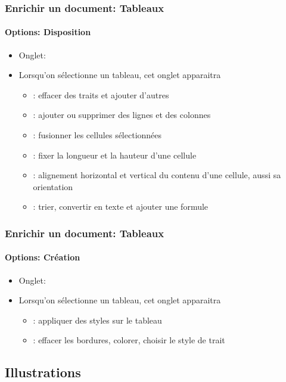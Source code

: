 \documentclass[xcolor=table]{beamer}
\begin{document}
\begin{frame}[t]
\frametitle{Enrichir un document: Tableaux}
\framesubtitle{Options: Disposition}


\begin{itemize}
	\item Onglet: 
	\item Lorsqu'on sélectionne un tableau, cet onglet apparaitra
	\begin{itemize}
		\item {} : effacer des traits et ajouter d'autres
		\item {} : ajouter ou supprimer des lignes et des colonnes
		\item {} : fusionner les cellules sélectionnées
		\item {} : fixer la longueur et la hauteur d'une cellule
		\item {} : alignement horizontal et vertical du contenu d'une cellule, aussi sa orientation
		\item {} : trier, convertir en texte et ajouter une formule
	\end{itemize}
\end{itemize}

\end{frame}

\begin{frame}[t]
\frametitle{Enrichir un document: Tableaux}
\framesubtitle{Options: Création}


\begin{itemize}
	\item Onglet: 
	\item Lorsqu'on sélectionne un tableau, cet onglet apparaitra
	\begin{itemize}
		\item {} : appliquer des styles sur le tableau
		\item {} : effacer les bordures, colorer, choisir le style de trait
	\end{itemize}
\end{itemize}

\end{frame}


\subsection{Illustrations}
\end{document}
